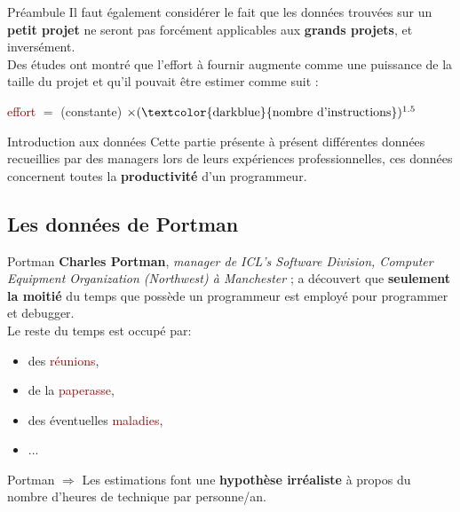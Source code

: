 \documentclass{beamer}
\newcommand{\blu}[1]{\textcolor{darkblue}{#1}}
\newcommand{\red}[1]{\textcolor{darkred}{#1}}
\begin{document}
\begin{frame}{Préambule}
Il faut également considérer le fait que les données trouvées sur un \textbf{petit projet} ne seront pas forcément applicables aux 
\textbf{grands projets}, et inversément. \\
$ $\\
Des études ont montré que l'effort à fournir augmente comme une puissance de la taille du projet et qu'il pouvait être estimer 
comme suit : \begin{center}\red{effort} $=$ (constante) $\times (\text{\blu{nombre d'instructions}})^{1.5}$\end{center}

\end{frame}

\begin{frame}{Introduction aux données}
Cette partie présente à présent différentes données recueillies par des managers lors de leurs expériences professionnelles, ces 
données concernent toutes la \textbf{productivité} d'un programmeur.
\end{frame}

\subsection{Les données de Portman}

\begin{frame}{Portman}
\textbf{Charles Portman}, \textit{manager de ICL's Software Division, Computer Equipment Organization (Northwest) à Manchester} ; 
a découvert que \textbf{seulement la moitié} du temps que possède un programmeur est employé pour programmer et debugger. \\
$ $\\
Le reste du temps est occupé par:
\begin{itemize}
\item des \red{réunions},
\item de la \red{paperasse},
\item des éventuelles \red{maladies},
\item ...
\end{itemize}
\end{frame}

\begin{frame}{Portman}
$\Rightarrow$ Les estimations font une \textbf{hypothèse irréaliste} à propos du nombre d'heures de technique par personne/an.
\end{frame}
\end{document}
